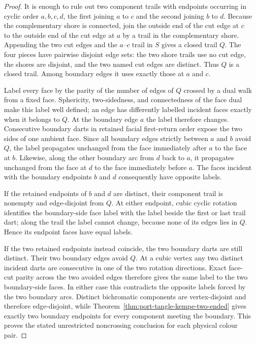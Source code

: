 \begin{proof}
It is enough to rule out two component trails with endpoints occurring in
cyclic order $a,b,c,d$, the first joining $a$ to $c$ and the second joining
$b$ to $d$.  Because the complementary shore is connected, join the outside
end of the cut edge at $c$ to the outside end of the cut edge at $a$ by a
trail in the complementary shore.  Appending the two cut edges and the
$a$--$c$ trail in $S$ gives a closed trail $Q$.  The four pieces have
pairwise disjoint edge sets: the two shore trails use no cut edge, the shores
are disjoint, and the two named cut edges are distinct.  Thus $Q$ is a
closed trail.  Among boundary edges it uses exactly those at $a$ and $c$.

Label every face by the parity of the number of edges of $Q$ crossed by a
dual walk from a fixed face.  Sphericity, two-sidedness, and connectedness of
the face dual make this label well defined; an edge has differently labelled
incident faces exactly when it belongs to $Q$.  At the boundary edge $a$
the label therefore changes.  Consecutive boundary darts in retained facial
first-return order expose the two sides of one ambient face.  Since all
boundary edges strictly between $a$ and $b$ avoid $Q$, the label propagates
unchanged from the face immediately after $a$ to the face at $b$.  Likewise,
along the other boundary arc from $d$ back to $a$, it propagates unchanged
from the face at $d$ to the face immediately before $a$.  The faces incident
with the boundary endpoints $b$ and $d$ consequently have opposite labels.

If the retained endpoints of $b$ and $d$ are distinct, their component trail
is nonempty and edge-disjoint from $Q$.  At either endpoint, cubic cyclic
rotation identifies the boundary-side face label with the label beside the
first or last trail dart; along the trail the label cannot change, because
none of its edges lies in $Q$.  Hence its endpoint faces have equal labels.

If the two retained endpoints instead coincide, the two boundary darts are
still distinct.  Their two boundary edges avoid $Q$.  At a cubic vertex any
two distinct incident darts are consecutive in one of the two rotation
directions.  Exact face-cut parity across the two avoided edges therefore
gives the same label to the two boundary-side faces.  In either case this
contradicts the opposite labels forced by the two boundary arcs.  Distinct
bichromatic components are vertex-disjoint and therefore edge-disjoint, while
Theorem~\ref{thm:port-tangle-kempe-two-ended} gives exactly two boundary
endpoints for every component meeting the boundary.  This proves the stated
unrestricted noncrossing conclusion for each physical colour pair.


\end{proof}
